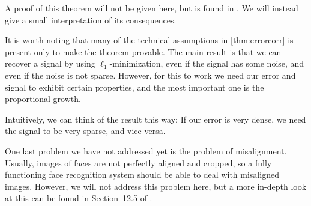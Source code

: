 A proof of this theorem will not be given here, but is found in \cite{wright10dense}. We will instead give a small interpretation of its consequences. 

It is worth noting that many of the technical assumptions in \cref{thm:errorcorr} is present only to make the theorem provable. The main result is that we can recover a signal by using $ \ell_{1} $-minimization, even if the signal has some noise, and even if the noise is not sparse. However, for this to work we need our error and signal to exhibit certain properties, and the most important one is the proportional growth. 

Intuitively, we can think of the result this way: If our error is very dense, we need the signal to be very sparse, and vice versa. 

One last problem we have not addressed yet is the problem of misalignment. Usually, images of faces are not perfectly aligned and cropped, so a fully functioning face recognition system should be able to deal with misaligned images. However, we will not address this problem here, but a more in-depth look at this can be found in Section~12.5 of \cite{eldar12theoryapplic}.









